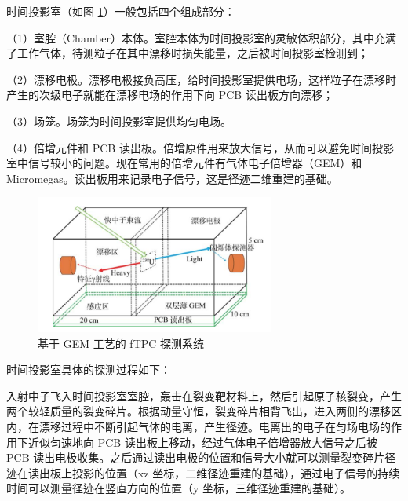 \documentclass[AutoFakeBold]{LZUThesis}
\begin{document}
时间投影室（如图 \ref{fig_GEM-TPC}）一般包括四个组成部分\cite{闫洋洋2018用于高精度裂变截面测量的时间投影室, 魏康2019基于GEM工艺的裂变时间投影室中裂变碎片的讨论}：

（1）室腔（Chamber）本体。室腔本体为时间投影室的灵敏体积部分，其中充满了工作气体，待测粒子在其中漂移时损失能量，之后被时间投影室检测到；

（2）漂移电极。漂移电极接负高压，给时间投影室提供电场，这样粒子在漂移时产生的次级电子就能在漂移电场的作用下向 PCB 读出板方向漂移；

（3）场笼。场笼为时间投影室提供均匀电场。

（4）倍增元件和 PCB 读出板。倍增原件用来放大信号，从而可以避免时间投影室中信号较小的问题。现在常用的倍增元件有气体电子倍增器（GEM）和 Micromegas。读出板用来记录电子信号，这是径迹二维重建的基础。

\begin{figure}[H]
    \centering
    \includegraphics[width=0.7\textwidth]{figures/GEM-TPC.png}
    \caption{基于 GEM 工艺的 fTPC 探测系统\cite{魏康2019基于GEM工艺的裂变时间投影室中裂变碎片的讨论}}
    \label{fig_GEM-TPC}
\end{figure}



时间投影室具体的探测过程如下：

入射中子飞入时间投影室室腔，轰击在裂变靶材料上，然后引起原子核裂变，产生两个较轻质量的裂变碎片。根据动量守恒，裂变碎片相背飞出，进入两侧的漂移区内，在漂移过程中不断引起气体的电离，产生径迹。电离出的电子在匀场电场的作用下近似匀速地向 PCB 读出板上移动，经过气体电子倍增器放大信号之后被 PCB 读出电极收集。之后通过读出电极的位置和信号大小就可以测量裂变碎片径迹在读出板上投影的位置（xz 坐标，二维径迹重建的基础），通过电子信号的持续时间可以测量径迹在竖直方向的位置（y 坐标，三维径迹重建的基础）\cite{魏康2019基于GEM工艺的裂变时间投影室中裂变碎片的讨论}。
\end{document}
